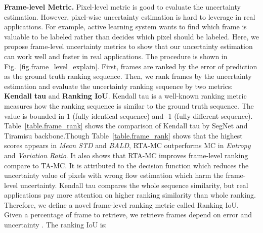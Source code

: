 \noindent\textbf{Frame-level Metric.} Pixel-level metric is good to evaluate the uncertainty estimation. However, pixel-wise uncertainty estimation is hard to leverage in real applications. For example, active learning system wants to find which frame is valuable to be labeled rather than decides which pixel should be labeled. Here, we propose frame-level uncertainty metrics to show that our uncertainty estimation can work well and faster in real applications. The procedure is shown in Fig.~\ref{fig.frame_level_explain}. First, frames are ranked by the error of prediction as the ground truth ranking sequence. Then, we rank frames by the uncertainty estimation and evaluate the uncertainty ranking sequence by two metrics: \textbf{Kendall tau} \cite{kendall1938new} and \textbf{Ranking IoU}. Kendall tau is a well-known ranking metric measures how the ranking sequence is similar to the ground truth sequence. The value is bounded in 1 (fully identical sequence) and -1 (fully different sequence). Table~\ref{table.frame_rank} shows the comparison of Kendall tau by SegNet and Tiramisu backbone.Though Table~\ref{table.frame_rank} shows that the highest scores appears in \textit{Mean STD} and \textit{BALD}, RTA-MC outperforms MC in \textit{Entropy} and \textit{Variation Ratio}. It also shows that RTA-MC improves frame-level ranking compare to TA-MC. It is attributed to the decision function  which reduces the uncertainty value of pixels with wrong flow estimation which harm the frame-level uncertainty. Kendall tau compares the whole sequence similarity, but real applications pay more attention on higher ranking similarity than whole ranking. Therefore, we define a novel frame-level ranking metric called Ranking IoU. Given a percentage of frame  to retrieve, we retrieve frames depend on error  and uncertainty . The ranking IoU is:
 
